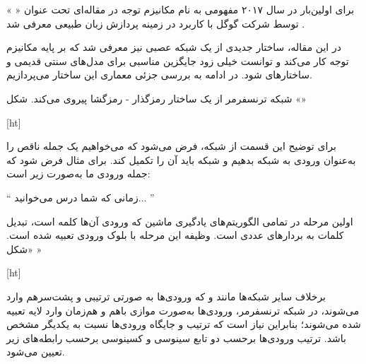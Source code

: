 












برای اولین‌بار در سال ۲۰۱۷ مفهومی به نام مکانیزم توجه در مقاله‌ای تحت عنوان «  » توسط شرکت گوگل با کاربرد در زمینه پردازش زبان طبیعی معرفی شد .

در این مقاله، ساختار جدیدی از یک شبکه عصبی نیز معرفی شد که بر پایه مکانیزم توجه کار می‌کند و توانست خیلی زود جایگزین مناسبی برای مدل‌های سنتی قدیمی و ساختارهای  شود. در ادامه به بررسی جزئی معماری این ساختار می‌پردازیم.




شبکه ترنسفرمر از یک ساختار رمزگذار - رمزگشا پیروی می‌کند. شکل «»



[ht]







برای توضیح این قسمت از شبکه، فرض می‌شود که می‌خواهیم یک جمله ناقص را به‌عنوان ورودی به شبکه بدهیم و شبکه باید آن را تکمیل کند. برای مثال فرض شود که جمله ورودی ما به‌صورت زیر است:

\begin{center}
`` زمانی که شما درس می‌خوانید... ''
\end{center}




اولین مرحله در تمامی الگوریتم‌های یادگیری ماشین که ورودی آن‌ها کلمه است، تبدیل کلمات به بردارهای عددی است. وظیفه این مرحله با بلوک ورودی تعبیه شده است. «شکل »


[ht]





برخلاف سایر شبکه‌ها مانند  و  که ورودی‌ها به صورتی ترتیبی و پشت‌سرهم وارد می‌شوند، در شبکه ترنسفرمر، ورودی‌ها به‌صورت موازی باهم و هم‌زمان وارد لایه تعبیه شده می‌شوند؛ بنابراین نیاز است که ترتیب و جایگاه ورودی‌ها نسبت به یکدیگر مشخص باشد. ترتیب ورودی‌ها برحسب دو تابع سینوسی و کسینوسی برحسب رابطه‌های زیر تعیین می‌شود.



